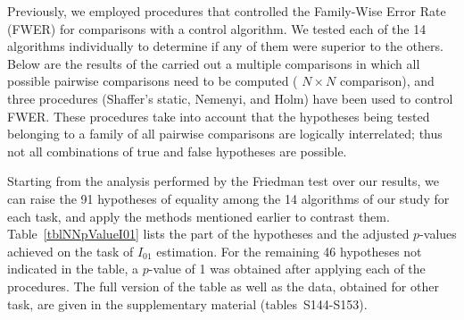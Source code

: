 \documentclass[a4paper,fleqn]{cas-dc}
\begin{document}
Previously, we employed procedures that controlled the Family-Wise Error Rate (FWER)
for comparisons with a control algorithm.
We tested each of the 14 algorithms individually to determine if any of them were superior to the others.
Below are the results of the carried out a multiple comparisons in which
all possible pairwise comparisons need to be computed ( $N\times N$ comparison),
and three procedures (Shaffer’s static, Nemenyi, and Holm) have been used to control FWER.
These procedures take into account that the hypotheses being tested belonging
to a family of all pairwise comparisons are logically interrelated;
thus not all combinations of true and false hypotheses are possible.

Starting from the analysis performed by the Friedman test over our results, we can raise the
91 hypotheses of equality among the 14 algorithms of our study for each task,
and apply the methods mentioned earlier to contrast them.
Table~\ref{tblNNpValueI01} lists the part of the hypotheses
and the adjusted $p$-values achieved on the task of $I_{01}$ estimation.
For the remaining 46 hypotheses not indicated in the table,
a $p$-value of 1 was obtained after applying each of the procedures.
The full version of the table as well as the data, obtained for other task,
are given in the supplementary material (tables~S144-S153).
\end{document}

